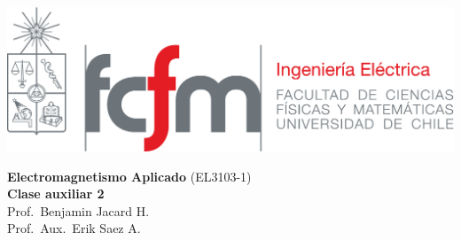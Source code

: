 \documentclass[
  11pt,
  letterpaper,
   addpoints,
   answers
  ]{exam}
\begin{document}
\noindent
\begin{minipage}{0.47\textwidth}
\includegraphics[width=\textwidth]{../fcfm_die}
\end{minipage}
\begin{minipage}{0.53\textwidth}
\begin{center} 
\large\textbf{Electromagnetismo Aplicado} (EL3103-1) \\
\large\textbf{Clase auxiliar 2} \\
\normalsize Prof.~Benjamin Jacard H.\\
\normalsize Prof.~Aux.~Erik Saez A.
\end{center}
\end{minipage}

\vspace{0.5cm}
\noindent
\vspace{.85cm}
\end{document}
